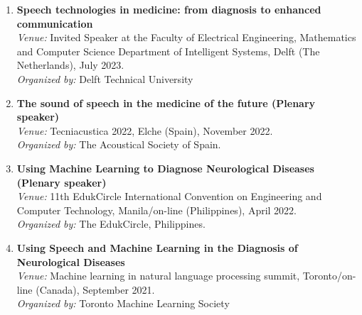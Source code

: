 \begin{enumerate}
  \item \textbf{Speech technologies in medicine: from diagnosis to enhanced communication}\\ \textit{Venue:} Invited Speaker at the Faculty of Electrical Engineering, Mathematics and Computer Science Department of Intelligent Systems, Delft (The Netherlands), July 2023.\\ \textit{Organized by:} Delft Technical University
  \item \textbf{The sound of speech in the medicine of the future (Plenary speaker)}\\ \textit{Venue:} Tecniacustica 2022, Elche (Spain), November 2022.\\ \textit{Organized by:} The Acoustical Society of Spain.
  \item \textbf{Using Machine Learning to Diagnose Neurological Diseases (Plenary speaker)}\\ \textit{Venue:} 11th EdukCircle International Convention on Engineering and Computer Technology, Manila/on-line (Philippines), April 2022.\\ \textit{Organized by:} The EdukCircle, Philippines.
  \item \textbf{Using Speech and Machine Learning in the Diagnosis of Neurological Diseases}\\ \textit{Venue:} Machine learning in natural language processing summit, Toronto/on-line (Canada), September 2021.\\ \textit{Organized by:} Toronto Machine Learning Society
\end{enumerate}
